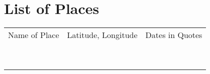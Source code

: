 \chapter*{List of Places}

\begin{longtable}{p{5cm}p{5cm}p{4cm}}
Name of Place & Latitude, Longitude & Dates in Quotes \\
              &                     &                 \\
              &                     &                 \\
              &                     &                 \\
              &                     &                 \\
              &                     &                 \\
              &                     &                 \\
              &                     &                 \\
              &                     &                 \\
              &                     &                
\end{longtable}